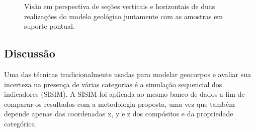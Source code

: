\begin{figure}[H]
	\caption{\label{ouro_reals} Visão em perspectiva de seções verticais e horizontais de duas realizações do modelo geológico juntamente com as amostras em suporte pontual.}
	\centering
     \hspace{1em}
\end{figure}

\subsection{Discussão}

Uma das técnicas tradicionalmente usadas para modelar geocorpos e avaliar sua incerteza na presença de várias categorias é a simulação sequencial dos indicadores (SISIM). A SISIM foi aplicada ao mesmo banco de dados a fim de comparar os resultados com a metodologia proposta, uma vez que também depende apenas das coordenadas x, y e z dos compósitos e da propriedade categórica. 

